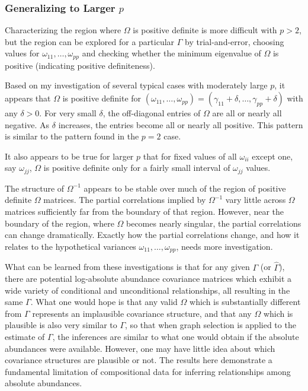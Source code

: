 \documentclass[12pt]{article}
\begin{document}
\subsubsection*{Generalizing to Larger $p$}

Characterizing the region where $\Omega$ is positive definite is more difficult with $p > 2$, but the region can be explored for a particular $\Gamma$ by trial-and-error, choosing values for $\omega_{11}, \dots, \omega_{pp}$ and checking whether the minimum eigenvalue of $\Omega$ is positive (indicating positive definiteness).

Based on my investigation of several typical cases with moderately large $p$, it appears that $\Omega$ is positive definite for $(\omega_{11}, \dots, \omega_{pp}) = (\gamma_{11} + \delta, \dots, \gamma_{pp} + \delta)$ with any $\delta > 0$. For very small $\delta$, the off-diagonal entries of $\Omega$ are all or nearly all negative. As $\delta$ increases, the entries become all or nearly all positive. This pattern is similar to the pattern found in the $p = 2$ case.

It also appears to be true for larger $p$ that for fixed values of all $\omega_{ii}$ except one, say $\omega_{jj}$, $\Omega$ is positive definite only for a fairly small interval of $\omega_{jj}$ values.

The structure of $\Omega^{-1}$ appears to be stable over much of the region of positive definite $\Omega$ matrices. The partial correlations implied by $\Omega^{-1}$ vary little across $\Omega$ matrices sufficiently far from the boundary of that region. However, near the boundary of the region, where $\Omega$ becomes nearly singular, the partial correlations can change dramatically. Exactly how the partial correlations change, and how it relates to the hypothetical variances $\omega_{11}, \dots, \omega_{pp}$, needs more investigation.

What can be learned from these investigations is that for any given $\Gamma$ (or $\hat{\Gamma}$), there are potential log-absolute abundance covariance matrices which exhibit a wide variety of conditional and unconditional relationships, all resulting in the same $\Gamma$. What one would hope is that any valid $\Omega$ which is substantially different from $\Gamma$ represents an implausible covariance structure, and that any $\Omega$ which is plausible is also very similar to $\Gamma$, so that when graph selection is applied to the estimate of $\Gamma$, the inferences are similar to what one would obtain if the absolute abundances were available. However, one may have little idea about which covariance structures are plausible or not. The results here demonstrate a fundamental limitation of compositional data for inferring relationships among absolute abundances.
\end{document}
